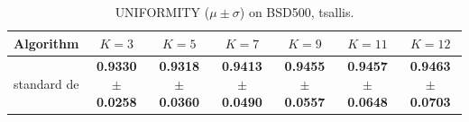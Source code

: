 \begin{table}[htbp]
\centering
\caption{UNIFORMITY ($\mu \pm \sigma$) on BSD500, tsallis.}
\label{tab:exp1-tsallis-uniformity}
\begin{tabular}{lcccccc}
\toprule
Algorithm & $K=3$ & $K=5$ & $K=7$ & $K=9$ & $K=11$ & $K=12$ \\
\midrule
standard de & \textbf{0.9330 $\pm$ 0.0258} & \textbf{0.9318 $\pm$ 0.0360} & \textbf{0.9413 $\pm$ 0.0490} & \textbf{0.9455 $\pm$ 0.0557} & \textbf{0.9457 $\pm$ 0.0648} & \textbf{0.9463 $\pm$ 0.0703} \\
\bottomrule
\end{tabular}
\end{table}